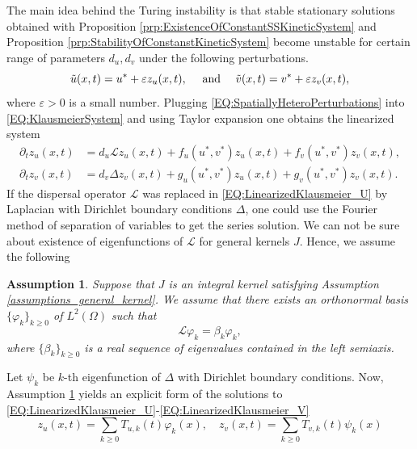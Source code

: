 \documentclass[12pt, a4paper]{article}
\theoremstyle{break}
\theoremstyle{break}
\theoremstyle{break}
\newtheorem{asm}{Assumption}[section]
\theoremstyle{break}
\theoremstyle{break}
\theoremstyle{break}
\theoremstyle{break}
\begin{document}
The main idea behind the Turing instability is that stable stationary solutions obtained with Proposition \ref{prp:ExistenceOfConstantSSKineticSystem} and Proposition \ref{prp:StabilityOfConstanstKineticSystem} become unstable for certain range of parameters $d_u, d_v$ under the following perturbations.
\begin{equation}
    \label{EQ:SpatiallyHeteroPerturbations}
    \Tilde{u}(x,t) = u^* + \varepsilon z_u(x, t), \quad \text{ and } \quad \Tilde{v}(x,t) = v^* + \varepsilon z_v(x, t),
\end{equation}
where $\varepsilon > 0$ is a small number. Plugging \eqref{EQ:SpatiallyHeteroPerturbations} into \eqref{EQ:KlausmeierSystem} and using Taylor expansion one obtains the linearized system
\begin{align}
    \partial_t z_u(x, t) &= d_u \mathcal{L} z_u(x, t) + f_u(u^*, v^*) z_u(x, t) + f_v(u^*, v^*) z_v(x,t), \label{EQ:LinearizedKlausmeier_U}\\
    \partial_t z_v(x, t) &= d_v \Delta z_v(x, t) + g_u(u^*, v^*) z_u(x, t) + g_v(u^*, v^*) z_v(x,t). \label{EQ:LinearizedKlausmeier_V}
\end{align}
If the dispersal operator $\mathcal{L}$ was replaced in \eqref{EQ:LinearizedKlausmeier_U} by Laplacian with Dirichlet boundary conditions $\Delta$, one could use the Fourier method of separation of variables to get the series solution. We can not be sure about existence of eigenfunctions of $\mathcal{L}$ for general kernels $J$. Hence, we assume the following
\begin{asm}
    \label{asm:eigenbasisforDispersal}
    Suppose that $J$ is an integral kernel satisfying Assumption \ref{assumptions_general_kernel}. We assume that there exists an orthonormal basis $\{ \varphi_k \}_{k \geq 0}$ of $L^2(\Omega)$ such that 
    \begin{equation}
        \mathcal{L} \varphi_k = \beta_k \varphi_k,
    \end{equation}
    where $\{ \beta_k \}_{k \geq 0}$ is a real sequence of eigenvalues contained in the left semiaxis.
\end{asm}
Let $\psi_k$ be $k$-th eigenfunction of $\Delta$ with Dirichlet boundary conditions. Now, Assumption \ref{asm:eigenbasisforDispersal} yields an explicit form of the solutions to \eqref{EQ:LinearizedKlausmeier_U}-\eqref{EQ:LinearizedKlausmeier_V}
\begin{equation}
    \label{EQ:FourierSeriesLinearizedProblem}
    z_u(x,t) = \sum_{k \geq 0} T_{u, k}(t) \varphi_k(x), \quad z_v(x,t) = \sum_{k \geq 0} T_{v, k}(t) \psi_k(x)
\end{equation}
\end{document}

